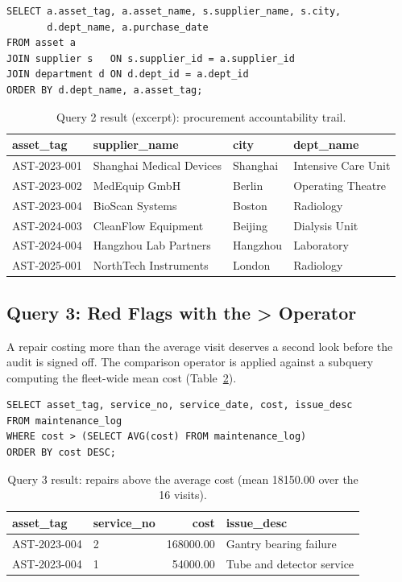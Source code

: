 \documentclass[conference]{IEEEtran}
\begin{document}
\begin{lstlisting}[style=sqlstyle]
SELECT a.asset_tag, a.asset_name, s.supplier_name, s.city,
       d.dept_name, a.purchase_date
FROM asset a
JOIN supplier s   ON s.supplier_id = a.supplier_id
JOIN department d ON d.dept_id = a.dept_id
ORDER BY d.dept_name, a.asset_tag;
\end{lstlisting}

\begin{table}[!t]
  \caption{Query 2 result (excerpt): procurement accountability trail.}
  \label{tab:q2}
  \centering
  \footnotesize
  \begin{tabular}{p{1.9cm}p{2.1cm}p{1.2cm}p{2.1cm}}
    \toprule
    asset\_tag & supplier\_name & city & dept\_name \\
    \midrule
    AST-2023-001 & Shanghai Medical Devices & Shanghai & Intensive Care Unit \\
    AST-2023-002 & MedEquip GmbH & Berlin & Operating Theatre \\
    AST-2023-004 & BioScan Systems & Boston & Radiology \\
    AST-2024-003 & CleanFlow Equipment & Beijing & Dialysis Unit \\
    AST-2024-004 & Hangzhou Lab Partners & Hangzhou & Laboratory \\
    AST-2025-001 & NorthTech Instruments & London & Radiology \\
    \bottomrule
  \end{tabular}
\end{table}

\subsection{Query 3: Red Flags with the \textgreater{} Operator}
A repair costing more than the average visit deserves a second look before
the audit is signed off. The comparison operator is applied against a
subquery computing the fleet-wide mean cost (Table~\ref{tab:q3}).

\begin{lstlisting}[style=sqlstyle]
SELECT asset_tag, service_no, service_date, cost, issue_desc
FROM maintenance_log
WHERE cost > (SELECT AVG(cost) FROM maintenance_log)
ORDER BY cost DESC;
\end{lstlisting}

\begin{table}[!t]
  \caption{Query 3 result: repairs above the average cost (mean 18150.00 over the 16 visits).}
  \label{tab:q3}
  \centering
  \footnotesize
  \begin{tabular}{llrl}
    \toprule
    asset\_tag & service\_no & cost & issue\_desc \\
    \midrule
    AST-2023-004 & 2 & 168000.00 & Gantry bearing failure \\
    AST-2023-004 & 1 & 54000.00 & Tube and detector service \\
    \bottomrule
  \end{tabular}
\end{table}
\end{document}
